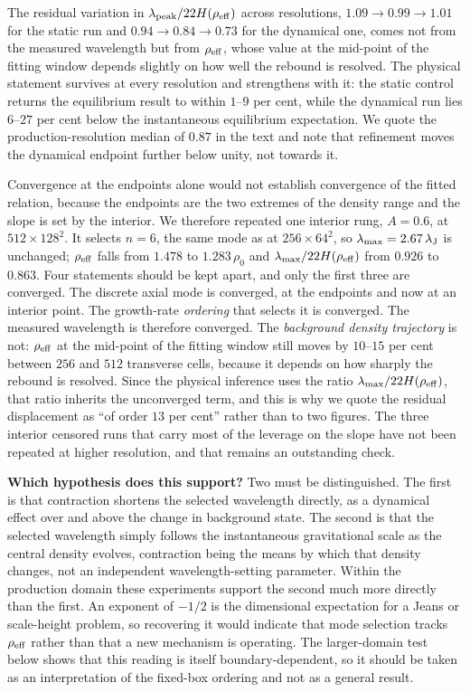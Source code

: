 \documentclass[usenatbib,twoside,twocolumn]{mnras}
\begin{document}
The residual variation in $\lambda_{\rm peak}/22H(\rho_{\rm eff})$ across resolutions, $1.09\to0.99\to1.01$ for the static run and $0.94\to0.84\to0.73$ for the dynamical one, comes not from the measured wavelength but from $\rho_{\rm eff}$, whose value at the mid-point of the fitting window depends slightly on how well the rebound is resolved. The physical statement survives at every resolution and strengthens with it: the static control returns the equilibrium result to within $1$--$9$ per cent, while the dynamical run lies $6$--$27$ per cent below the instantaneous equilibrium expectation. We quote the production-resolution median of $0.87$ in the text and note that refinement moves the dynamical endpoint further below unity, not towards it.

Convergence at the endpoints alone would not establish convergence of the fitted relation, because the endpoints are the two extremes of the density range and the slope is set by the interior. We therefore repeated one interior rung, $A=0.6$, at $512\times128^2$. It selects $n=6$, the same mode as at $256\times64^2$, so $\lambda_{\rm max}=2.67\,\lambda_{\rm J}$ is unchanged; $\rho_{\rm eff}$ falls from $1.478$ to $1.283\,\rho_0$ and $\lambda_{\rm max}/22H(\rho_{\rm eff})$ from $0.926$ to $0.863$. Four statements should be kept apart, and only the first three are converged. The discrete axial mode is converged, at the endpoints and now at an interior point. The growth-rate \emph{ordering} that selects it is converged. The measured wavelength is therefore converged. The \emph{background density trajectory} is not: $\rho_{\rm eff}$ at the mid-point of the fitting window still moves by $10$--$15$ per cent between $256$ and $512$ transverse cells, because it depends on how sharply the rebound is resolved. Since the physical inference uses the ratio $\lambda_{\rm max}/22H(\rho_{\rm eff})$, that ratio inherits the unconverged term, and this is why we quote the residual displacement as ``of order $13$ per cent'' rather than to two figures. The three interior censored runs that carry most of the leverage on the slope have not been repeated at higher resolution, and that remains an outstanding check.





\smallskip\noindent\textbf{Which hypothesis does this support?} Two must be distinguished. The first is that contraction shortens the selected wavelength directly, as a dynamical effect over and above the change in background state. The second is that the selected wavelength simply follows the instantaneous gravitational scale as the central density evolves, contraction being the means by which that density changes, not an independent wavelength-setting parameter. Within the production domain these experiments support the second much more directly than the first. An exponent of $-1/2$ is the dimensional expectation for a Jeans or scale-height problem, so recovering it would indicate that mode selection tracks $\rho_{\rm eff}$ rather than that a new mechanism is operating. The larger-domain test below shows that this reading is itself boundary-dependent, so it should be taken as an interpretation of the fixed-box ordering and not as a general result.
\end{document}
